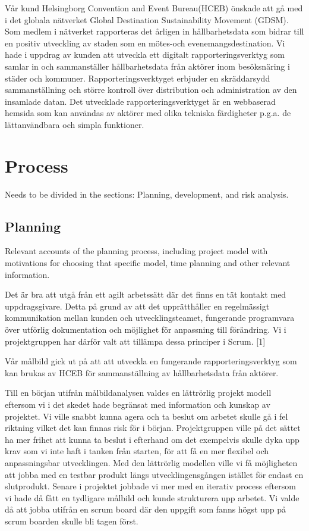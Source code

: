 \documentclass[12pt]{article}
\begin{document}
Vår kund Helsingborg Convention and Event Bureau(HCEB) önskade att gå med i det globala nätverket Global Destination Sustainability Movement (GDSM). Som medlem i nätverket rapporteras det årligen in hållbarhetsdata som bidrar till en positiv utveckling av staden som en mötes-och evenemangsdestination. Vi hade i uppdrag av kunden att utveckla ett digitalt rapporteringsverktyg som samlar in och sammanställer hållbarhetsdata från aktörer inom besöksnäring i städer och kommuner. Rapporteringsverktyget erbjuder en skräddarsydd sammanställning och större kontroll över distribution och administration av den insamlade datan. Det utvecklade rapporteringsverktyget är en webbaserad hemsida som kan användas av aktörer med olika tekniska färdigheter p.g.a. de lättanvändbara och simpla funktioner.





\section{Process}
Needs to be divided in the sections: Planning, development, and risk analysis.

\subsection{Planning}
Relevant accounts of the planning process, including project model with motivations for choosing that specific model, time planning and other relevant information.

Det är bra att utgå från ett agilt arbetssätt där det finns en tät kontakt med uppdragsgivare. Detta på grund av att det upprätthåller en regelmässigt kommunikation mellan kunden och utvecklingsteamet, fungerande programvara över utförlig dokumentation och möjlighet för anpassning till förändring. Vi i projektgruppen har därför valt att tillämpa dessa principer i Scrum. [1] 

Vår målbild gick ut på att att utveckla en fungerande rapporteringsverktyg som kan brukas av HCEB för sammanställning av hållbarhetsdata från aktörer. 

Till en början utifrån målbildanalysen valdes en lättrörlig projekt modell eftersom vi i det skedet hade begränsat med information och kunskap av projektet. Vi ville snabbt kunna agera och ta beslut om arbetet skulle gå i fel riktning vilket det kan finnas risk för i början. Projektgruppen ville på det sättet ha mer frihet att kunna ta beslut i efterhand om det exempelvis skulle dyka upp krav som vi inte haft i tanken från starten, för att få en mer flexibel och anpassningsbar utvecklingen. Med den lättrörlig modellen ville vi få möjligheten att jobba med en testbar produkt längs utvecklingensgången istället för endast en slutprodukt. Senare i projektet jobbade vi mer med en iterativ process eftersom vi hade då fått en tydligare målbild och kunde strukturera upp arbetet. Vi valde då att jobba utifrån en scrum board där den uppgift som fanns högst upp på scrum boarden skulle bli tagen först.
\end{document}
